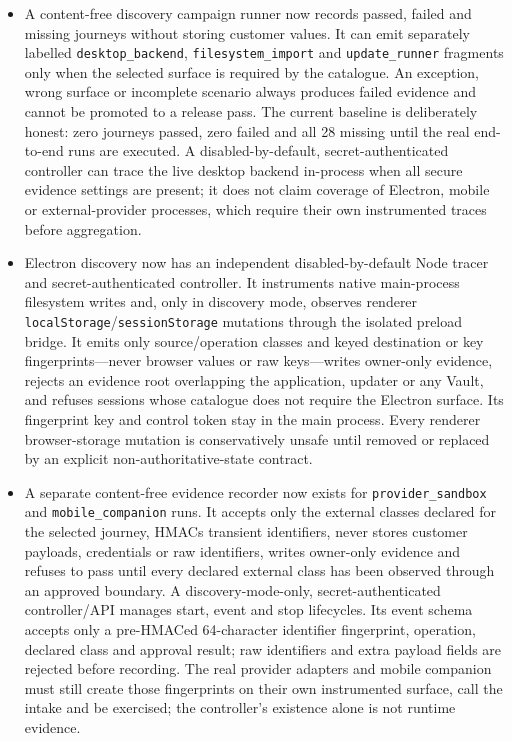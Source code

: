 \documentclass[11pt]{article}
\begin{document}
\begin{itemize}
  \item A content-free discovery campaign runner now records passed, failed and missing journeys without storing customer values. It can emit separately labelled \texttt{desktop\_backend}, \texttt{filesystem\_import} and \texttt{update\_runner} fragments only when the selected surface is required by the catalogue. An exception, wrong surface or incomplete scenario always produces failed evidence and cannot be promoted to a release pass. The current baseline is deliberately honest: zero journeys passed, zero failed and all 28 missing until the real end-to-end runs are executed. A disabled-by-default, secret-authenticated controller can trace the live desktop backend in-process when all secure evidence settings are present; it does not claim coverage of Electron, mobile or external-provider processes, which require their own instrumented traces before aggregation.
  \item Electron discovery now has an independent disabled-by-default Node tracer and secret-authenticated controller. It instruments native main-process filesystem writes and, only in discovery mode, observes renderer \texttt{localStorage}/\texttt{sessionStorage} mutations through the isolated preload bridge. It emits only source/operation classes and keyed destination or key fingerprints---never browser values or raw keys---writes owner-only evidence, rejects an evidence root overlapping the application, updater or any Vault, and refuses sessions whose catalogue does not require the Electron surface. Its fingerprint key and control token stay in the main process. Every renderer browser-storage mutation is conservatively unsafe until removed or replaced by an explicit non-authoritative-state contract.
  \item A separate content-free evidence recorder now exists for \texttt{provider\_sandbox} and \texttt{mobile\_companion} runs. It accepts only the external classes declared for the selected journey, HMACs transient identifiers, never stores customer payloads, credentials or raw identifiers, writes owner-only evidence and refuses to pass until every declared external class has been observed through an approved boundary. A discovery-mode-only, secret-authenticated controller/API manages start, event and stop lifecycles. Its event schema accepts only a pre-HMACed 64-character identifier fingerprint, operation, declared class and approval result; raw identifiers and extra payload fields are rejected before recording. The real provider adapters and mobile companion must still create those fingerprints on their own instrumented surface, call the intake and be exercised; the controller's existence alone is not runtime evidence.

\end{itemize}
\end{document}
